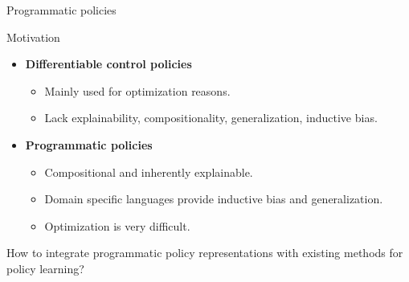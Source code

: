\begin{frame}{Programmatic policies}
\end{frame}
\begin{frame}{Motivation}

\begin{itemize}
    \item \textbf{Differentiable control policies}
    \begin{itemize}
        \item Mainly used for optimization reasons.
        \item Lack explainability, compositionality, generalization, inductive bias.
    \end{itemize}
    \item \textbf{Programmatic policies}
    \begin{itemize}
        \item Compositional and inherently explainable.
        \item Domain specific languages provide inductive bias and generalization.
        \item Optimization is very difficult.
    \end{itemize}
\end{itemize}

How to integrate programmatic policy representations with existing methods for policy learning?


\end{frame}


